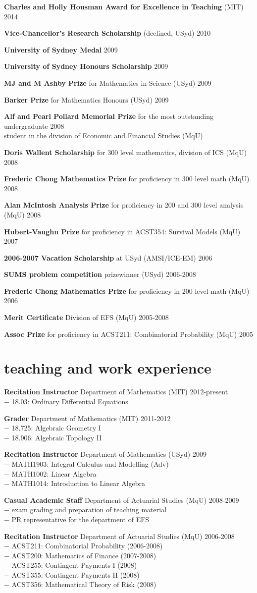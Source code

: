 \documentclass[margin,line]{resume}
\newcommand{\CVsection}[1]{\section{\mysidestyle #1}}
\newcommand{\entry}[3]{\textbf{#1} #2 \hfill {#3}
           
\vspace{-2.7mm}}
\newcommand{\twolineentry}[4]{\textbf{#1} #2 \hfill {#4}\\%
#3
           
\vspace{-2.7mm}}
\newcommand{\FINALentry}[3]{\textbf{#1} #2 \hfill {#3}}
\newcommand{\FINALtwolineentry}[4]{\textbf{#1} #2 \hfill {#4}\\%
#3}
\begin{document}
\begin{resume}
\entry{Charles and Holly Housman Award for Excellence in Teaching}{(MIT)}{2014}
\entry{Vice-Chancellor's Research Scholarship}{(declined, USyd)}{2010}
\entry{University of Sydney Medal}{}{2009}
\entry{University of Sydney Honours Scholarship}{}{2009}
\entry{MJ and M Ashby Prize}{for Mathematics in Science (USyd)}{2009}
\entry{Barker Prize}{for Mathematics Honours (USyd)}{2009}
\twolineentry{Alf and Pearl Pollard Memorial Prize}{for the most outstanding undergraduate}{student in the division of Economic and Financial Studies (MqU)}{2008}
\entry{Doris Wallent Scholarship}{for 300 level mathematics, division of ICS (MqU)}{2008}
\entry{Frederic Chong Mathematics Prize}{for proficiency in 300 level math (MqU)}{2008}
\entry{Alan McIntosh Analysis Prize}{for proficiency in 200 and 300 level analysis (MqU)}{2008}
\entry{Hubert-Vaughn Prize}{for proficiency in ACST354: Survival Models (MqU)}{2007}
\entry{2006-2007 Vacation Scholarship}{at USyd (AMSI/ICE-EM)}{2006}
\entry{SUMS problem competition}{prizewinner (USyd)}{2006-2008}
\entry{Frederic Chong Mathematics Prize}{for proficiency in 200 level math (MqU)}{2006}
\entry{Merit Certificate}{Division of EFS (MqU)}{2005-2008}
\FINALentry{Assoc Prize}{for proficiency in ACST211: Combinatorial Probability (MqU)}{2005}


\CVsection{teaching and work experience}

\twolineentry{Recitation Instructor}{Department of Mathematics (MIT)}{\phantom{space}$-$ 18.03: Ordinary Differential Equations}{2012-present}
\twolineentry{Grader}{Department of Mathematics (MIT)}{%
\phantom{space}$-$ 18.725: Algebraic Geometry I\\
\phantom{space}$-$ 18.906: Algebraic Topology II%
}{2011-2012}
\twolineentry{Recitation Instructor}{Department of Mathematics (USyd)}{%
\phantom{space}$-$ MATH1903: Integral Calculus and Modelling (Adv)\\
\phantom{space}$-$ MATH1002: Linear Algebra\\
\phantom{space}$-$ MATH1014: Introduction to Linear Algebra%
}{2009}
\twolineentry{Casual Academic Staff}{Department of Actuarial Studies (MqU)}{%
\phantom{space}$-$ exam grading and preparation of teaching material\\
\phantom{space}$-$ PR representative for the department of EFS%
}{2008-2009}
\FINALtwolineentry{Recitation Instructor}{Department of Actuarial Studies (MqU)}{%
\phantom{space}$-$ ACST211: Combinatorial Probability (2006-2008)\\
\phantom{space}$-$ ACST200: Mathematics of Finance (2007-2008)\\
\phantom{space}$-$ ACST255: Contingent Payments I (2008)\\
\phantom{space}$-$ ACST355: Contingent Payments II (2008)\\
\phantom{space}$-$ ACST356: Mathematical Theory of Risk (2008)%
}{2006-2008}



\end{resume}
\end{document}
